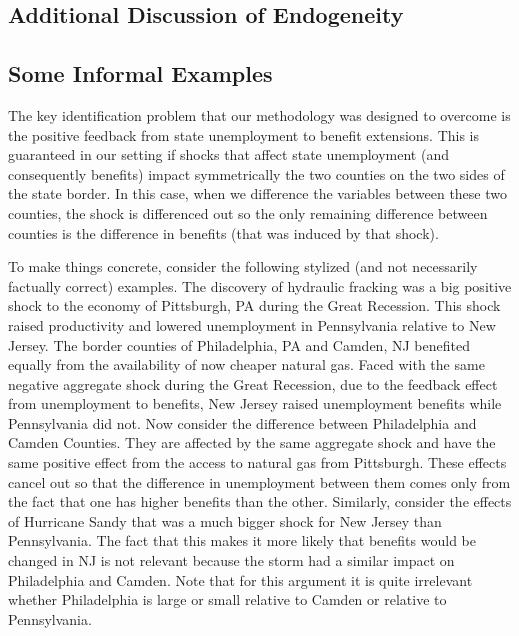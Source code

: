 \documentclass[12pt]{article}
\newcommand{\1}{\mathbf{1}}
\begin{document}
\begin{appendix}
\clearpage
\section{Additional Discussion of Endogeneity}
\label{app:endogeneity}

\subsection{Some Informal Examples}
\label{app:endogeneity_examples}

The key identification problem that our methodology was designed to overcome is the positive feedback from state unemployment to benefit extensions. This is guaranteed in our setting if shocks that affect state unemployment (and consequently benefits) impact symmetrically the two counties on the two sides of the state border. In this case, when we difference the variables between these two counties, the shock is differenced out so the only remaining difference between counties is the difference in benefits (that was induced by that shock).

To make things concrete, consider the following stylized (and not necessarily factually correct) examples. The discovery of hydraulic fracking was a big positive shock to the economy of Pittsburgh, PA during the Great Recession. This shock raised productivity and lowered unemployment in Pennsylvania relative to New Jersey. The border counties of Philadelphia, PA and Camden, NJ benefited equally from the availability of now cheaper natural gas. Faced with the same negative aggregate shock during the Great Recession, due to the feedback effect from unemployment to benefits, New Jersey raised unemployment benefits while Pennsylvania did not. Now consider the difference between Philadelphia and Camden Counties. They are affected by the same aggregate shock and have the same positive effect from the access to natural gas from Pittsburgh. These effects cancel out so that the difference in unemployment between them comes only from the fact that one has higher benefits than the other. Similarly, consider the effects of Hurricane Sandy that was a much bigger shock for New Jersey than Pennsylvania. The fact that this makes it more likely that benefits would be changed in NJ is not relevant because the storm had a similar impact on Philadelphia and Camden. Note that for this argument it is quite irrelevant whether Philadelphia is large or small relative to Camden or relative to Pennsylvania.


\end{appendix}
\end{document}
